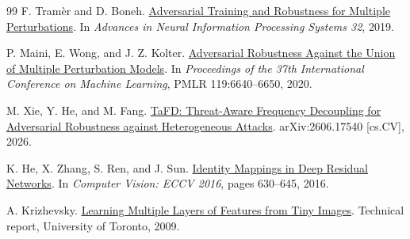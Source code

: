 \documentclass[11pt]{article}
\begin{document}
\begin{thebibliography}{99}
F. Tram\`er and D. Boneh.
\newblock \href{https://proceedings.neurips.cc/paper_files/paper/2019/hash/5d4ae76f053f8f2516ad12961ef7fe97-Abstract.html}{Adversarial Training and Robustness for Multiple Perturbations}.
\newblock In \emph{Advances in Neural Information Processing Systems 32}, 2019.

P. Maini, E. Wong, and J. Z. Kolter.
\newblock \href{https://proceedings.mlr.press/v119/maini20a.html}{Adversarial Robustness Against the Union of Multiple Perturbation
Models}.
\newblock In \emph{Proceedings of the 37th International Conference on Machine
Learning}, PMLR 119:6640--6650, 2020.

M. Xie, Y. He, and M. Fang.
\newblock \href{https://arxiv.org/abs/2606.17540}{TaFD: Threat-Aware Frequency Decoupling for Adversarial Robustness
against Heterogeneous Attacks}.
\newblock arXiv:2606.17540 [cs.CV], 2026.

K. He, X. Zhang, S. Ren, and J. Sun.
\newblock \href{https://doi.org/10.1007/978-3-319-46493-0_38}{Identity Mappings in Deep Residual Networks}.
\newblock In \emph{Computer Vision: ECCV 2016}, pages 630--645, 2016.

A. Krizhevsky.
\newblock \href{https://www.cs.toronto.edu/~kriz/cifar.html}{Learning Multiple Layers of Features from Tiny Images}.
\newblock Technical report, University of Toronto, 2009.

\end{thebibliography}
\end{document}
